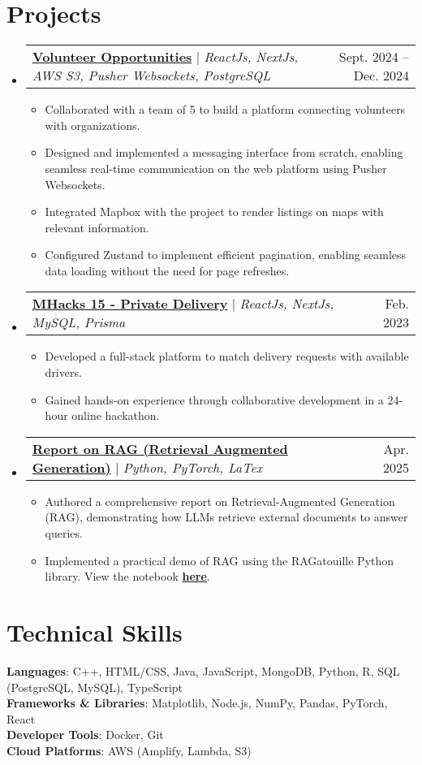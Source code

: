 \documentclass[letterpaper,11pt]{article}
\makeatletter
\newcommand{\resumeItem}[1]{
  \item\small{
    {#1 \vspace{-2pt}}
  }
}
\newcommand{\resumeProjectHeading}[2]{
    \item
    \begin{tabular*}{0.97\textwidth}{l@{\extracolsep{\fill}}r}
      \small#1 & #2 \\
    \end{tabular*}\vspace{-7pt}
}
\newcommand{\resumeSubHeadingListStart}{\begin{itemize}[leftmargin=0.15in, label={}]}
\newcommand{\resumeSubHeadingListEnd}{\end{itemize}}
\newcommand{\resumeItemListStart}{\begin{itemize}}
\newcommand{\resumeItemListEnd}{\end{itemize}\vspace{-5pt}}
\makeatother
\begin{document}
\section{Projects}
    \resumeSubHeadingListStart
      \resumeProjectHeading
          {\href{https://volunteer-opportunities.vercel.app/}{\color{Blue}\textbf{Volunteer Opportunities}} $|$ \emph{ReactJs, NextJs, AWS S3, Pusher Websockets, PostgreSQL}}{Sept. 2024 -- Dec. 2024}
          \resumeItemListStart
            \resumeItem{Collaborated with a team of 5 to build a platform connecting volunteers with organizations.}
            \resumeItem{Designed and implemented a messaging interface from scratch, enabling seamless real-time communication on the
 web platform using Pusher Websockets.}
            \resumeItem{Integrated Mapbox with the project to render listings on maps with relevant information.}
            \resumeItem{Configured Zustand to implement efficient pagination, enabling seamless data loading without the need for page
 refreshes.}
          \resumeItemListEnd
      \resumeProjectHeading
          {\href{https://devpost.com/software/privatedelivery/}{\color{Blue}\textbf{MHacks 15 - Private Delivery}} $|$ \emph{ReactJs, NextJs, MySQL, Prisma}}{Feb. 2023}
          \resumeItemListStart
            \resumeItem{Developed a full-stack platform to match delivery requests with available drivers.}
            \resumeItem{Gained hands-on experience through collaborative development in a 24-hour online hackathon.}
          \resumeItemListEnd
      \resumeProjectHeading
          {\href{https://github.com/SebastianNewberry/Final_Project_Intro_LLM/blob/main/Report.pdf}{\color{Blue}\textbf{Report on RAG (Retrieval Augmented Generation)}} $|$ \emph{Python, PyTorch, LaTex}}{Apr. 2025}
          \resumeItemListStart
            \resumeItem{Authored a comprehensive report on Retrieval-Augmented Generation (RAG), demonstrating how LLMs retrieve external documents to answer queries.}
            \resumeItem{Implemented a practical demo of RAG using the RAGatouille Python library. View the notebook \href{https://colab.research.google.com/github/SebastianNewberry/Final_Project_Intro_LLM/blob/main/langchain_ollama_rag.ipynb}{\color{Blue}\textbf{here}}.}
          \resumeItemListEnd
    \resumeSubHeadingListEnd



%
\section{Technical Skills}
 \begin{itemize}[leftmargin=0.15in, label={}]
    \small{\item{
     \textbf{Languages}{: C++, HTML/CSS, Java, JavaScript, MongoDB, Python, R, SQL (PostgreSQL, MySQL), TypeScript} \\
     \textbf{Frameworks \& Libraries}{: Matplotlib, Node.js, NumPy, Pandas, PyTorch, React} \\
     \textbf{Developer Tools}{: Docker, Git} \\
     \textbf{Cloud Platforms}{: AWS (Amplify, Lambda, S3)}
    }}
 \end{itemize}


\end{document}
